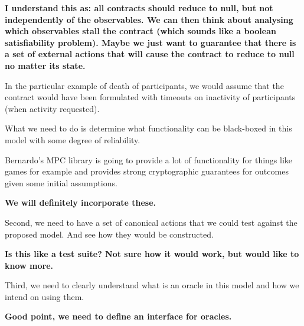 \documentclass[
      acmsmall
    , screen
    , review=true
  ]{acmart}
\begin{document}
{\bf
I understand this as: all contracts should reduce to null, but not independently of the observables. We can then think about analysing which observables stall the contract (which sounds like a boolean satisfiability problem). Maybe we just want to guarantee that there is a set of external actions that will cause the contract to reduce to null no matter its state.


In the particular example of death of participants, we would assume that the contract would have been formulated with timeouts on inactivity of participants (when activity requested).
}

What we need to do is determine what functionality can be black-boxed in this model with some degree of reliability.


Bernardo's MPC library is going to provide a lot of functionality for things like games for example and provides strong cryptographic guarantees for outcomes given some initial assumptions.

{\bf
We will definitely incorporate these.
}

Second, we need to have a set of canonical actions that we could test against the proposed model. And see how they would be constructed.

{\bf
Is this like a test suite? Not sure how it would work, but would like to know more.
}

Third, we need to clearly understand what is an oracle in this model and how we intend on using them.





{\bf
Good point, we need to define an interface for oracles.
}





















\clearpage


\end{document}
